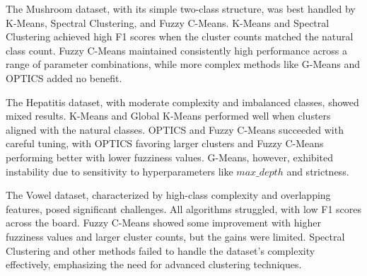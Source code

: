 The Mushroom dataset, with its simple two-class structure, was best handled by K-Means,
Spectral Clustering, and Fuzzy C-Means. K-Means and Spectral Clustering achieved high F1 
scores when the cluster counts matched the natural class count. Fuzzy C-Means maintained
consistently high performance across a range of parameter combinations, while more complex 
methods like G-Means and OPTICS added no benefit.

The Hepatitis dataset, with moderate complexity and imbalanced classes, showed mixed results.
K-Means and Global K-Means performed well when clusters aligned with the natural classes. 
OPTICS and Fuzzy C-Means succeeded with careful tuning, with OPTICS favoring larger clusters and Fuzzy C-Means performing better with lower fuzziness values.
G-Means, however, exhibited instability due to sensitivity to hyperparameters like $max\_depth$ and strictness.

The Vowel dataset, characterized by high-class complexity and overlapping 
features, posed significant challenges. All algorithms struggled, with low F1 
scores across the board. Fuzzy C-Means showed some improvement with higher fuzziness 
values and larger cluster counts, but the gains were limited. Spectral Clustering 
and other methods failed to handle the dataset's complexity effectively, emphasizing the need for advanced clustering techniques.